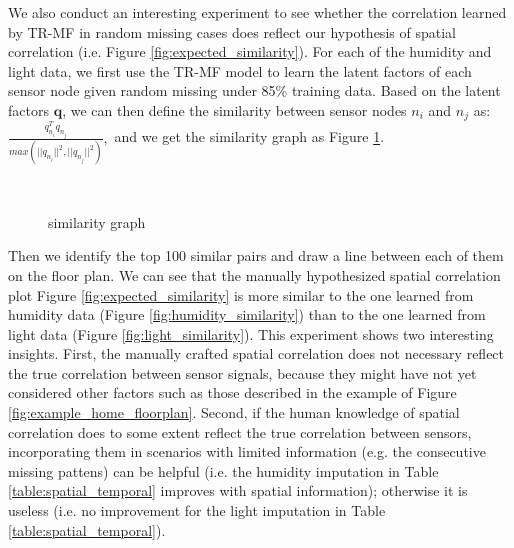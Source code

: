 We also conduct an interesting experiment to see whether the correlation learned by TR-MF in random missing cases does reflect our hypothesis of spatial correlation (i.e. Figure \ref{fig:expected_similarity}). For each of the humidity and light data, we first use the TR-MF model to learn the latent factors of each sensor node given random missing under 85\% training data. Based on the latent factors $\mathbf{q}$, we can then define the similarity between sensor nodes $n_i$ and $n_j$ as:
$\frac{q_{n_i}^T q_{n_j}}{max(||q_{n_i}||^2, ||q_{n_j}||^2)},$
and we get the similarity graph as Figure \ref{fig:similarity}.
\begin{figure}[ftbp]
\centering
{}\\
\hspace{0in}
\caption{similarity graph}
\label{fig:similarity}
\end{figure}

Then we identify the top 100 similar pairs and draw a line between each of them on the floor plan. We can see that the manually hypothesized spatial correlation plot Figure \ref{fig:expected_similarity} is more similar to the one learned from humidity data (Figure \ref{fig:humidity_similarity}) than to the one learned from light data (Figure \ref{fig:light_similarity}). This experiment shows two interesting insights. First, the manually crafted spatial correlation does not necessary reflect the true correlation between sensor signals, because they might have not yet considered other factors such as those described in the example of Figure \ref{fig:example_home_floorplan}. Second, if the human knowledge of spatial correlation does to some extent reflect the true correlation between sensors, incorporating them in scenarios with limited information (e.g. the consecutive missing pattens) can be helpful (i.e. the humidity imputation in Table \ref{table:spatial_temporal} improves with spatial information); otherwise it is useless (i.e. no improvement for the light imputation in Table \ref{table:spatial_temporal}).
